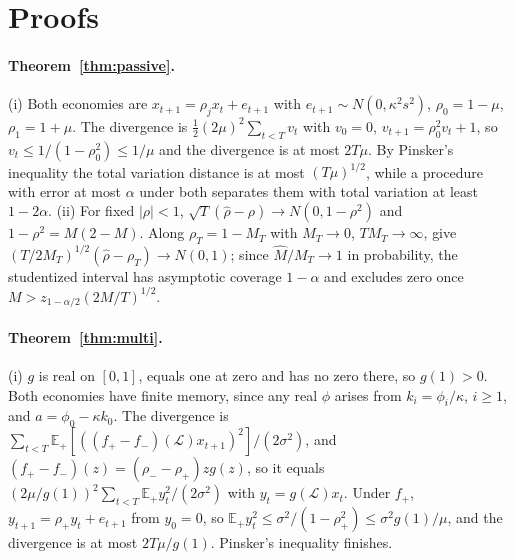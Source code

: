 \documentclass[12pt]{article}
\theoremstyle{definition}
\theoremstyle{remark}
\newcommand{\E}{\mathbb{E}}
\begin{document}
\appendix
\section{Proofs}\label{app:proofs}

\paragraph{Theorem~\ref{thm:passive}.} (i) Both economies are $x_{t+1}=\rho_jx_t+e_{t+1}$ with $e_{t+1}\sim N(0,\kappa^2s^2)$, $\rho_0=1-\mu$, $\rho_1=1+\mu$. The divergence is $\tfrac12(2\mu)^2\sum_{t<T}v_t$ with $v_0=0$, $v_{t+1}=\rho_0^2v_t+1$, so $v_t\le1/(1-\rho_0^2)\le1/\mu$ and the divergence is at most $2T\mu$. By Pinsker's inequality the total variation distance is at most $(T\mu)^{1/2}$, while a procedure with error at most $\alpha$ under both separates them with total variation at least $1-2\alpha$. (ii) For fixed $|\rho|<1$, $\sqrt T(\hat\rho-\rho)\to N(0,1-\rho^2)$ \citep{mannwald1943} and $1-\rho^2=M(2-M)$. Along $\rho_T=1-M_T$ with $M_T\to0$, $TM_T\to\infty$, \citet{phillips2007} give $(T/2M_T)^{1/2}(\hat\rho-\rho_T)\to N(0,1)$; since $\hat M/M_T\to1$ in probability, the studentized interval has asymptotic coverage $1-\alpha$ and excludes zero once $M>z_{1-\alpha/2}(2M/T)^{1/2}$.

\paragraph{Theorem~\ref{thm:multi}.} (i) $g$ is real on $[0,1]$, equals one at zero and has no zero there, so $g(1)>0$. Both economies have finite memory, since any real $\phi$ arises from $k_i=\phi_i/\kappa$, $i\ge1$, and $a=\phi_0-\kappa k_0$. The divergence is $\sum_{t<T}\E_+[((f_+-f_-)(\mathcal L)x_{t+1})^2]/(2\sigma^2)$, and $(f_+-f_-)(z)=(\rho_--\rho_+)zg(z)$, so it equals $(2\mu/g(1))^2\sum_{t<T}\E_+y_t^2/(2\sigma^2)$ with $y_t=g(\mathcal L)x_t$. Under $f_+$, $y_{t+1}=\rho_+y_t+e_{t+1}$ from $y_0=0$, so $\E_+y_t^2\le\sigma^2/(1-\rho_+^2)\le\sigma^2g(1)/\mu$, and the divergence is at most $2T\mu/g(1)$. Pinsker's inequality finishes.
\end{document}
